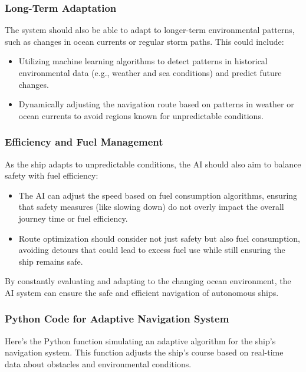 \documentclass{article}
\begin{document}
\subsubsection{\large Long-Term Adaptation}
The system should also be able to adapt to longer-term environmental patterns, such as changes in ocean currents or regular storm paths. This could include:
\begin{itemize}
    \item Utilizing machine learning algorithms to detect patterns in historical environmental data (e.g., weather and sea conditions) and predict future changes.
    \item Dynamically adjusting the navigation route based on patterns in weather or ocean currents to avoid regions known for unpredictable conditions.
\end{itemize}

\subsubsection{\large Efficiency and Fuel Management}
As the ship adapts to unpredictable conditions, the AI should also aim to balance safety with fuel efficiency:
\begin{itemize}
    \item The AI can adjust the speed based on fuel consumption algorithms, ensuring that safety measures (like slowing down) do not overly impact the overall journey time or fuel efficiency.
    \item Route optimization should consider not just safety but also fuel consumption, avoiding detours that could lead to excess fuel use while still ensuring the ship remains safe.
\end{itemize}

By constantly evaluating and adapting to the changing ocean environment, the AI system can ensure the safe and efficient navigation of autonomous ships.

\subsubsection{\large Python Code for Adaptive Navigation System}

Here’s the Python function simulating an adaptive algorithm for the ship’s navigation system. This function adjusts the ship’s course based on real-time data about obstacles and environmental conditions.
\end{document}
